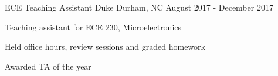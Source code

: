 \begin{cventries}
    \cventry
    {ECE Teaching Assistant} %
    {Duke} %
    {Durham, NC} %
    {August 2017 - December 2017} %
    {
      \begin{cvitems} %
        \item{Teaching assistant for ECE 230, Microelectronics}
        \item{Held office hours, review sessions and graded homework}
        \item{Awarded TA of the year}
      \end{cvitems}
    }
\end{cventries}
